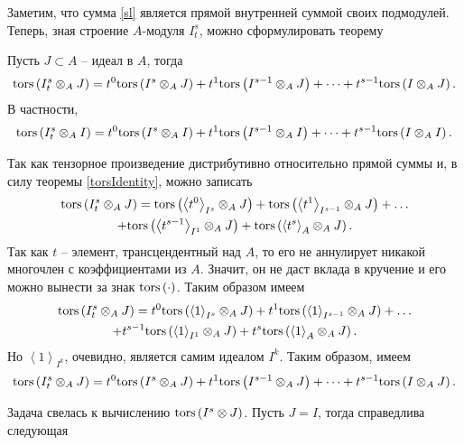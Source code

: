     Заметим, что сумма \eqref{sl} является прямой внутренней суммой своих подмодулей.
    Теперь, зная строение $A$-модуля $I^s_t$, можно сформулировать теорему
    \begin{Theorem} \label{tors_hard}
        Пусть $J \subset A$ -- идеал в $A$, тогда
        \begin{equation*}
            \textup{tors}\left(I^s_t \otimes_A J\right) = t^0\textup{tors}\left(I^s \otimes_A J\right) + t^1\textup{tors}\left(I^{s-1}\otimes_A J\right) + \dots + t^{s - 1}\textup{tors}\left(I \otimes_A J\right).
        \end{equation*}
        В частности,
        \begin{equation*}
            \textup{tors}\left(I^s_t \otimes_A I\right) = t^0\textup{tors}\left(I^s \otimes_A I\right) + t^1\textup{tors}\left(I^{s-1}\otimes_A I\right) + \dots + t^{s - 1}\textup{tors}\left(I \otimes_A I\right).
        \end{equation*}
    \end{Theorem}
    \begin{Proof}
        Так как тензорное произведение дистрибутивно относительно прямой суммы и, в силу теоремы 
        \ref{torsIdentity}, можно записать 
        \begin{multline*}
            \textup{tors}\left(I^s_t \otimes_A J\right) =  \textup{tors}\left(\left< t^0 \right>_{I^s} \otimes_A J\right) + 
            \textup{tors}\left(\left< t^1 \right>_{I^{s-1}} \otimes_A J\right) + \dots \\+
            \textup{tors}\left(\left< t^{s - 1} \right>_{I^1} \otimes_A J\right) + 
            \textup{tors}\left(\left< t^{s} \right>_{A} \otimes_A J\right).
        \end{multline*}
        Так как $t$ -- элемент, трансцендентный над $A$, то его не аннулирует никакой многочлен с
        коэффициентами из $A$. Значит, он не даст вклада в кручение и его можно вынести за знак $\textup{tors}\left(\cdot\right)$.
        Таким образом имеем
        \begin{multline*}
            \textup{tors}\left(I^s_t \otimes_A J\right) =  t^0\textup{tors}\left(\left< 1 \right>_{I^s} \otimes_A J\right) + 
            t^1 \textup{tors}\left(\left< 1\right>_{I^{s-1}} \otimes_A J\right) + \dots \\+
            t^{s - 1}\textup{tors}\left(\left< 1 \right>_{I^1} \otimes_A J\right) + 
            t^{s}\textup{tors}\left(\left< 1 \right>_{A} \otimes_A J\right).
        \end{multline*}
        Но $\left< 1 \right>_{I^k}$, очевидно, является самим идеалом $I^k$. Таким образом, имеем 
        \begin{equation*}
            \textup{tors}\left(I^s_t \otimes_A J\right) = t^0\textup{tors}\left(I^s \otimes_A J\right) + t^1\textup{tors}\left(I^{s-1}\otimes_A J\right) + \dots + t^{s - 1}\textup{tors}\left(I \otimes_A J\right).
        \end{equation*}
    \end{Proof}
    Задача свелась к вычислению $\textup{tors}\left(I^s \otimes J\right)$. Пусть $J = I$, тогда справедлива следующая 

